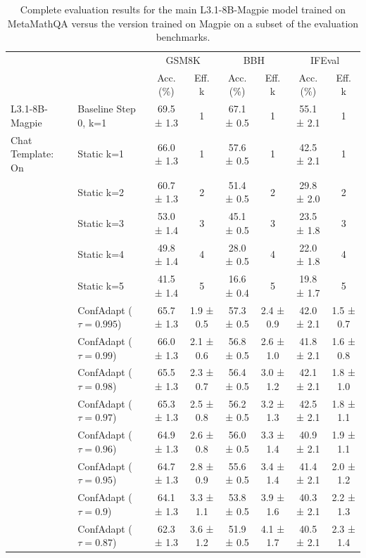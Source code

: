 \documentclass{article}
\theoremstyle{plain}
\theoremstyle{definition}
\theoremstyle{remark}
\begin{document}
\begin{table}[h!]
\small
\caption{Complete evaluation results for the main L3.1-8B-Magpie model trained on MetaMathQA versus the version trained on Magpie on a subset of the evaluation benchmarks.}
\label{tab:abl-l3-data-evals}
\centering
\begin{tabular}{llcccccc}
\toprule
 &  & \multicolumn{2}{c}{GSM8K} & \multicolumn{2}{c}{BBH} & \multicolumn{2}{c}{IFEval} \\
 &  & Acc. (\%) & Eff. k & Acc. (\%) & Eff. k & Acc. (\%) & Eff. k \\
\midrule
L3.1-8B-Magpie & Baseline Step 0, k=1 & 69.5 ± 1.3 & 1 & 67.1 ± 0.5 & 1 & 55.1 ± 2.1 & 1 \\
 Chat Template: On & Static k=1 & 66.0 ± 1.3 & 1 & 57.6 ± 0.5 & 1 & 42.5 ± 2.1 & 1 \\
 & Static k=2 & 60.7 ± 1.3 & 2 & 51.4 ± 0.5 & 2 & 29.8 ± 2.0 & 2 \\
 & Static k=3 & 53.0 ± 1.4 & 3 & 45.1 ± 0.5 & 3 & 23.5 ± 1.8 & 3 \\
 & Static k=4 & 49.8 ± 1.4 & 4 & 28.0 ± 0.5 & 4 & 22.0 ± 1.8 & 4 \\
 & Static k=5 & 41.5 ± 1.4 & 5 & 16.6 ± 0.4 & 5 & 19.8 ± 1.7 & 5 \\
 & ConfAdapt ($\tau=0.995$) & 65.7 ± 1.3 & 1.9 ± 0.5 & 57.3 ± 0.5 & 2.4 ± 0.9 & 42.0 ± 2.1 & 1.5 ± 0.7 \\
 & ConfAdapt ($\tau=0.99$) & 66.0 ± 1.3 & 2.1 ± 0.6 & 56.8 ± 0.5 & 2.6 ± 1.0 & 41.8 ± 2.1 & 1.6 ± 0.8 \\
 & ConfAdapt ($\tau=0.98$) & 65.5 ± 1.3 & 2.3 ± 0.7 & 56.4 ± 0.5 & 3.0 ± 1.2 & 42.1 ± 2.1 & 1.8 ± 1.0 \\
 & ConfAdapt ($\tau=0.97$) & 65.3 ± 1.3 & 2.5 ± 0.8 & 56.2 ± 0.5 & 3.2 ± 1.3 & 42.5 ± 2.1 & 1.8 ± 1.1 \\
 & ConfAdapt ($\tau=0.96$) & 64.9 ± 1.3 & 2.6 ± 0.8 & 56.0 ± 0.5 & 3.3 ± 1.4 & 40.9 ± 2.1 & 1.9 ± 1.1 \\
 & ConfAdapt ($\tau=0.95$) & 64.7 ± 1.3 & 2.8 ± 0.9 & 55.6 ± 0.5 & 3.4 ± 1.4 & 41.4 ± 2.1 & 2.0 ± 1.2 \\
 & ConfAdapt ($\tau=0.9$) & 64.1 ± 1.3 & 3.3 ± 1.1 & 53.8 ± 0.5 & 3.9 ± 1.6 & 40.3 ± 2.1 & 2.2 ± 1.3 \\
 & ConfAdapt ($\tau=0.87$) & 62.3 ± 1.3 & 3.6 ± 1.2 & 51.9 ± 0.5 & 4.1 ± 1.7 & 40.5 ± 2.1 & 2.3 ± 1.4 \\

\end{tabular}
\end{table}
\end{document}
